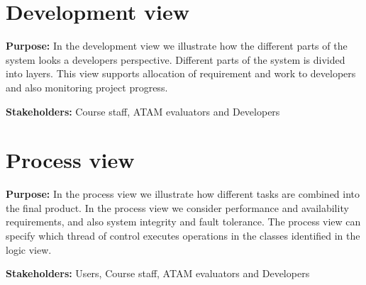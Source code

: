     \section{Development view}
    \textbf{Purpose:} In the development view we illustrate how the different parts of the system looks a developers perspective. Different parts of the system is divided into layers. This view supports allocation of requirement and work to developers and also monitoring project progress.  
    
    \noindent\textbf{Stakeholders:} Course staff, ATAM evaluators and Developers
    

    
    
    
    \section{Process view}
    \noindent\textbf{Purpose:} In the process view we illustrate how different tasks are combined into the final product. In the process view we consider performance and availability requirements, and also system integrity and fault tolerance.
    The process view can specify which thread of control executes operations in the classes identified in the logic view. 

    \noindent\textbf{Stakeholders:} Users, Course staff, ATAM evaluators and Developers 
